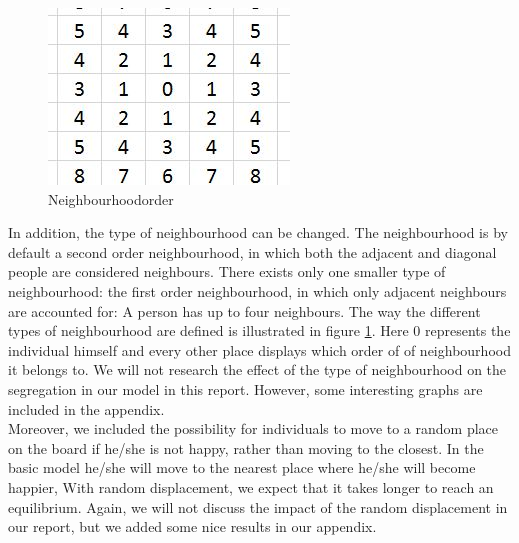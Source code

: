 
\begin{figure}
\vspace{-20pt}
\centering
\includegraphics[scale=0.5]{buurtorde.jpg}
\caption{Neighbourhoodorder}
\vspace{-15pt}
\label{fig:neighbourhood}
\end{figure}

In addition,  the type of neighbourhood can be changed.
The neighbourhood is  by default a second order neighbourhood, in which both the adjacent and diagonal people are considered neighbours.
There exists only one smaller type of neighbourhood: the first order neighbourhood, in which only adjacent neighbours are accounted for: A person has up to four neighbours.
The way the different types of neighbourhood are defined is illustrated in figure \ref{fig:neighbourhood}.
Here $0$ represents the individual himself and every other place displays which order of  of neighbourhood it belongs to.
We will not research the effect of the type of neighbourhood on the segregation in our model in this report.
However, some interesting graphs are included in the appendix.\\

Moreover, we included the possibility for individuals to move to a random place on the board if he/she is not happy, rather than moving to the closest.
In the basic model he/she will move to the nearest place where he/she will become happier, With random displacement, we expect that it takes longer to reach an equilibrium.
Again, we will not discuss the impact of the random displacement in our report, but we added some nice results in our appendix.\\

